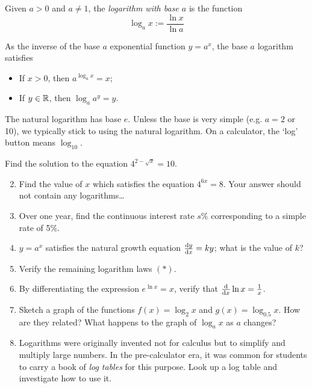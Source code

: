 \begin{defn}{}{}
	Given $a>0$ and $a\neq 1$, the \emph{logarithm with base $a$} is the function
	\[
		\log_ax :=\frac{\ln x}{\ln a}
	\]
\end{defn}

As the inverse of the base $a$ exponential function $y=a^x$, the base $a$ logarithm satisfies
\begin{itemize}
	\item If $x>0$, then $a^{\log_a x}=x$;
	\item If $y\in\R$, then $\log_a a^y=y$.
\end{itemize}
The natural logarithm has base $e$. Unless the base is very simple (e.g.{} $a=2$ or 10), we typically stick to using the natural logarithm. On a calculator, the `log' button means $\log_{10}$.


\begin{exercises}{}{}
	\exstart Find the solution to the equation $4^{2-\sqrt x}=10$.
	\begin{enumerate}\setcounter{enumi}{1}
	  \item Find the value of $x$ which satisfies the equation $4^{6x}=8$. Your answer should not contain any logarithms\ldots
	  
	  \item Over one year, find the continuous interest rate $s\%$ corresponding to a simple rate of 5\%.
	
	  \item $y=a^x$ satisfies the natural growth equation $\diff[y]x=ky$; what is the value of $k$?
	  
		\item Verify the remaining logarithm laws $(\ast)$.
	
	  \item By differentiating the expression $e^{\ln x}=x$, verify that $\diff x\ln x=\frac 1x$.
	  
	  \item Sketch a graph of the functions $f(x)=\log_2x$ and $g(x)=\log_{0.5}x$. How are they related? What happens to the graph of $\log_ax$ as $a$ changes?
	
	  \item Logarithms were originally invented not for calculus but to simplify and multiply large numbers. In the pre-calculator era, it was common for students to carry a book of \emph{log tables} for this purpose. Look up a log table and investigate how to use it.
	\end{enumerate}
\end{exercises}


